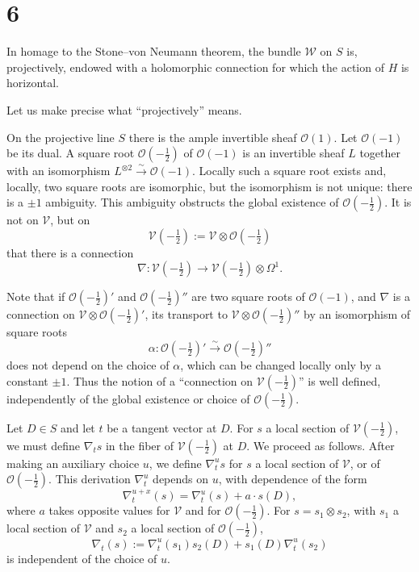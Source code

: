 \documentclass[12pt,a4paper]{article}
\theoremstyle{plain}
\theoremstyle{definition}
\theoremstyle{remark}
\begin{document}
\section*{6}

In homage to the Stone--von Neumann theorem, the bundle $\mathscr W$ on $S$ is, projectively, endowed with a holomorphic connection for which the action of $H$ is horizontal.

Let us make precise what ``projectively'' means.

On the projective line $S$ there is the ample invertible sheaf $\mathcal O(1)$. Let $\mathcal O(-1)$ be its dual. A square root $\mathcal O(-\frac12)$ of $\mathcal O(-1)$ is an invertible sheaf $L$ together with an isomorphism $L^{\otimes 2}\xrightarrow{\sim}\mathcal O(-1)$. Locally such a square root exists and, locally, two square roots are isomorphic, but the isomorphism is not unique: there is a $\pm 1$ ambiguity. This ambiguity obstructs the global existence of $\mathcal O(-\frac12)$. It is not on $\mathscr V$, but on
\begin{equation}\label{eq:6.1}
\mathscr V(-\tfrac12):=\mathscr V\otimes \mathcal O(-\tfrac12)\tag{6.1}
\end{equation}
that there is a connection
\[
\nabla\colon \mathscr V(-\tfrac12)\to \mathscr V(-\tfrac12)\otimes \Omega^1.
\]

Note that if $\mathcal O(-\frac12)'$ and $\mathcal O(-\frac12)''$ are two square roots of $\mathcal O(-1)$, and $\nabla$ is a connection on $\mathscr V\otimes \mathcal O(-\frac12)'$, its transport to $\mathscr V\otimes \mathcal O(-\frac12)''$ by an isomorphism of square roots
\[
\alpha\colon \mathcal O(-\tfrac12)'\xrightarrow{\sim}\mathcal O(-\tfrac12)''
\]
does not depend on the choice of $\alpha$, which can be changed locally only by a constant $\pm 1$. Thus the notion of a ``connection on $\mathscr V(-\frac12)$'' is well defined, independently of the global existence or choice of $\mathcal O(-\frac12)$.

Let $D\in S$ and let $t$ be a tangent vector at $D$. For $s$ a local section of $\mathscr V(-\frac12)$, we must define $\nabla_t s$ in the fiber of $\mathscr V(-\frac12)$ at $D$. We proceed as follows. After making an auxiliary choice $u$, we define $\nabla_t^u s$ for $s$ a local section of $\mathscr V$, or of $\mathcal O(-\frac12)$. This derivation $\nabla_t^u$ depends on $u$, with dependence of the form
\[
\nabla_t^{u+x}(s)=\nabla_t^u(s)+a\cdot s(D),
\]
where $a$ takes opposite values for $\mathscr V$ and for $\mathcal O(-\frac12)$. For $s=s_1\otimes s_2$, with $s_1$ a local section of $\mathscr V$ and $s_2$ a local section of $\mathcal O(-\frac12)$,
\[
\nabla_t(s):=\nabla_t^u(s_1)s_2(D)+s_1(D)\nabla_t^u(s_2)
\]
is independent of the choice of $u$.
\end{document}
